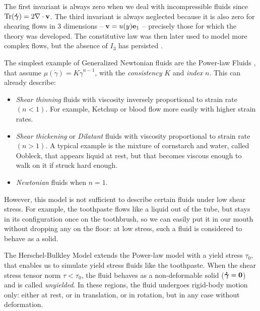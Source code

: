 \documentclass[11 pt]{report}
\begin{document}
The first invariant is always zero when we deal with incompressible fluids since $\Tr(\boldsymbol{\dot \gamma}) = 2 \nabla \cdot \mathbf{v}$. The third invariant is always neglected because it is also zero for shearing flows in 3 dimensions -- $\mathbf{v} = u(y)\mathbf{e}_1$ -- precisely those for which the theory was developed. The constitutive law was then later used to model more complex flows, but the absence of $I_3$ has persisted \cite{bird1987dynamics}.

The simplest example of Generalized Newtonian fluids are the Power-law Fluids \cite{bird1987dynamics,Geophysical}, that assume $\mu(\dot\gamma) = K \dot \gamma^{n-1}$, with the \textit{consistency} $K$ and \textit{index} $n$. This can already describe:
\begin{itemize}[label=---, topsep=0pt]
    \setlength{\itemsep}{0pt}
    \item\textit{Shear thinning} fluids with viscosity inversely proportional to strain rate $(n<1)$. For example, Ketchup or blood flow more easily with higher strain rates.
    \item\textit{Shear thickening} or \textit{Dilatant} fluids with viscosity proportional to strain rate $(n>1)$. A typical example is the mixture of cornstarch and water, called Oobleck, that appears liquid at rest, but that becomes viscous enough to walk on it if struck hard enough.
    \item \textit{Newtonian} fluids when $n=1$.
\end{itemize}

However, this model is not sufficient to describe certain fluids under low shear stress. For example, the toothpaste flows like a liquid out of the tube, but stays in its configuration once on the toothbrush, so we can easily put it in our mouth without dropping any on the floor: at low stress, such a fluid is considered to behave as a solid.

The Herschel-Bulkley Model \cite{bird1987dynamics,Geophysical,Coussot} extends the Power-law model with a yield stress $\tau_0$, that enables us to simulate yield stress fluids like the toothpaste. When the shear stress tensor norm $\tau < \tau_0$, the fluid behaves as a non-deformable solid ($\boldsymbol{\dot \gamma}=\mathbf{0}$) and is called \textit{unyielded}. In these regions, the fluid undergoes rigid-body motion only: either at rest, or in translation, or in rotation, but in any case without deformation.
\end{document}
